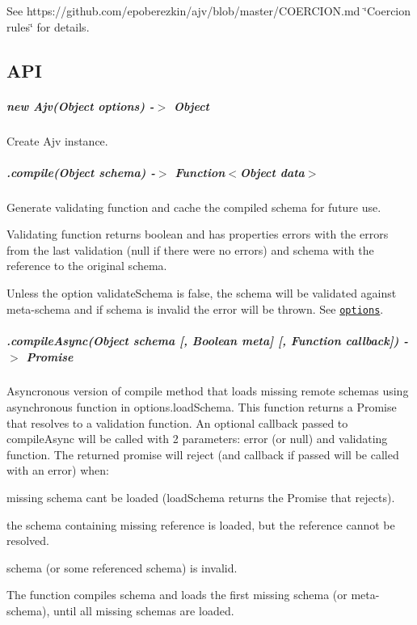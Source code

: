See https\+://github.com/epoberezkin/ajv/blob/master/\+C\+O\+E\+R\+C\+I\+O\+N.\+md \char`\"{}\+Coercion rules\char`\"{} for details.

\subsection*{A\+PI}

\subparagraph*{new Ajv(\+Object options) -\/$>$ Object}

Create Ajv instance.

\subparagraph*{.compile(\+Object schema) -\/$>$ Function$<$Object data$>$}

Generate validating function and cache the compiled schema for future use.

Validating function returns boolean and has properties {\ttfamily errors} with the errors from the last validation ({\ttfamily null} if there were no errors) and {\ttfamily schema} with the reference to the original schema.

Unless the option {\ttfamily validate\+Schema} is false, the schema will be validated against meta-\/schema and if schema is invalid the error will be thrown. See \href{#options}{\tt options}.

\subparagraph*{\label{_api-compileAsync}%
.compile\+Async(\+Object schema \mbox{[}, Boolean meta\mbox{]} \mbox{[}, Function callback\mbox{]}) -\/$>$ Promise}

Asyncronous version of {\ttfamily compile} method that loads missing remote schemas using asynchronous function in {\ttfamily options.\+load\+Schema}. This function returns a Promise that resolves to a validation function. An optional callback passed to {\ttfamily compile\+Async} will be called with 2 parameters\+: error (or null) and validating function. The returned promise will reject (and callback if passed will be called with an error) when\+:


\begin{DoxyItemize}
\item missing schema can\textquotesingle{}t be loaded ({\ttfamily load\+Schema} returns the Promise that rejects).
\item the schema containing missing reference is loaded, but the reference cannot be resolved.
\item schema (or some referenced schema) is invalid.
\end{DoxyItemize}

The function compiles schema and loads the first missing schema (or meta-\/schema), until all missing schemas are loaded.

